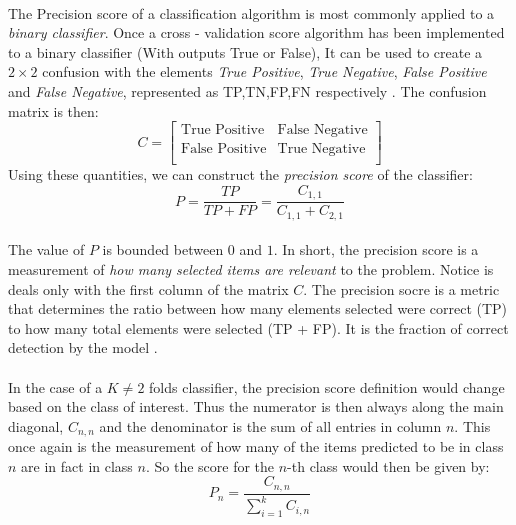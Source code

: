 \documentclass[12pt,letterpaper]{article}
\begin{document}
\paragraph*{}The Precision score of a classification algorithm is most commonly applied to a \textit{binary classifier}. Once a cross - validation score algorithm has been implemented to a binary classifier (With outputs \textsf{True} or \textsf{False}), It can be used to create a $2 \times 2$ confusion with the elements \textit{True Positive}, \textit{True Negative}, \textit{False Positive} and \textit{False Negative}, represented as TP,TN,FP,FN respectively \cite{James}. The confusion matrix is then:
\begin{equation}
C = 
\begin{bmatrix}
\text{True Positive} & \text{False Negative} \\
\text{False Positive} & \text{True Negative} \\
\end{bmatrix}
\end{equation}
Using these quantities, we can construct the \textit{precision score} of the classifier:
\begin{equation}
\label{precision score}
P = \frac{TP}{TP + FP} = \frac{C_{1,1}}{C_{1,1}+C_{2,1}}
\end{equation}
\paragraph*{}The value of $P$ is bounded between $0$ and $1$. In short, the precision score is a measurement of \textit{how many selected items are relevant} to the problem. Notice is deals only with the first column of the matrix $C$. The precision socre is a metric that determines the ratio between how many elements selected were correct (TP) to how many total elements were selected (TP + FP). It is the fraction of correct detection by the model \cite{Goodfellow}. 
\paragraph*{}In the case of a $K \neq 2$ folds classifier, the precision score definition would change based on the class of interest. Thus the numerator is then always along the main diagonal, $C_{n,n}$ and the denominator is the sum of all entries in column $n$. This once again is the measurement of how many of the items predicted to be in class $n$ are in fact in class $n$. So the score for the $n$-th class would then be given by:
\begin{equation}
P_n = \frac{C_{n,n}}{\sum_{i=1}^{k}C_{i,n}}
\end{equation}
\end{document}
